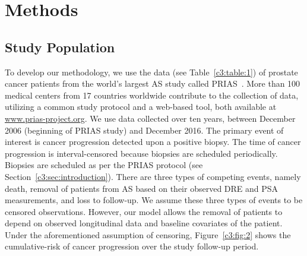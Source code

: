\section{Methods}
\label{c3:sec:methods}
\subsection{Study Population}
\label{c3:subsec:study_population}
To develop our methodology, we use the data (see Table~\ref{c3:table:1}) of prostate cancer patients from the world's largest AS study called PRIAS~\citep{bokhorst2016decade}. More than 100 medical centers from 17 countries worldwide contribute to the collection of data, utilizing a common study protocol and a web-based tool, both available at \url{www.prias-project.org}. We use data collected over ten years, between December 2006 (beginning of PRIAS study) and December 2016. The primary event of interest is cancer progression detected upon a positive biopsy. The time of cancer progression is interval-censored because biopsies are scheduled periodically. Biopsies are scheduled as per the PRIAS protocol (see Section~\ref{c3:sec:introduction}). There are three types of competing events, namely death, removal of patients from AS based on their observed DRE and PSA measurements, and loss to follow-up. We assume these three types of events to be censored observations. However, our model allows the removal of patients to depend on observed longitudinal data and baseline covariates of the patient. Under the aforementioned assumption of censoring, Figure~\ref{c3:fig:2} shows the cumulative-risk of cancer progression over the study follow-up period.

